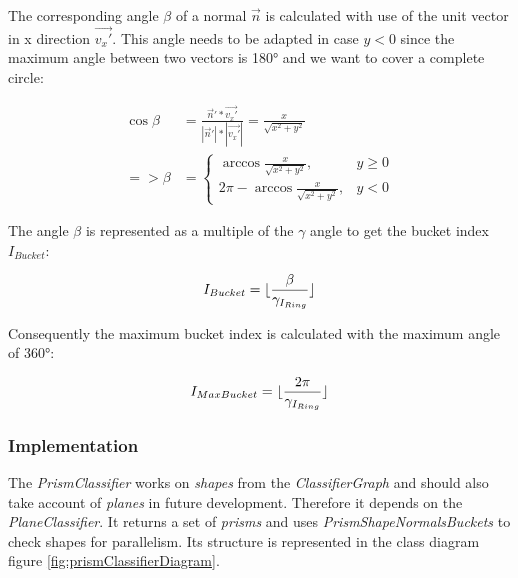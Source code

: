\documentclass[../ClassicThesis.tex]{subfiles}
\begin{document}
The corresponding angle $ \beta $ of a normal $ \vec{n} $ is calculated with use of the unit vector in x direction $ \vec{v_{x}'} $. This angle needs to be adapted in case $ y < 0 $ since the maximum angle between two vectors is 180° and we want to cover a complete circle:

\begin{equation}
\begin{split}
    \cos{\beta} & = \frac{\vec{n}' * \vec{v_{x}'}}{|\vec{n}'| * |\vec{v_{x}'}|} = \frac{x}{\sqrt{x^{2} + y^{2}}} \\
    => \beta & = \begin{cases}
        \arccos{ \frac{x}{\sqrt{x^{2} + y^{2}}} }, & y \geq 0 \\
        2 \pi - \arccos{ \frac{x}{\sqrt{x^{2} + y^{2}}} }, & y < 0
    \end{cases}
\end{split}
\end{equation}

The angle $ \beta $ is represented as a multiple of the $ \gamma $ angle to get the bucket index $ I_{Bucket} $:

\begin{equation}
    I_{Bucket} = \lfloor\frac{\beta}{ {\gamma}_{I_{Ring}} }\rfloor
\end{equation}

Consequently the maximum bucket index is calculated with the maximum angle of 360°:

\begin{equation}
    I_{MaxBucket} = \lfloor\frac{2 \pi}{ {\gamma}_{I_{Ring}} }\rfloor
\end{equation}



\subsubsection{Implementation}

The \emph{PrismClassifier} works on \emph{shapes} from the \emph{ClassifierGraph} and should also take account of \emph{planes} in future development. Therefore it depends on the \emph{PlaneClassifier}. It returns a set of \emph{prisms} and uses \emph{PrismShapeNormalsBuckets} to check shapes for parallelism. Its structure is represented in the class diagram figure \ref{fig:prismClassifierDiagram}.
\end{document}
